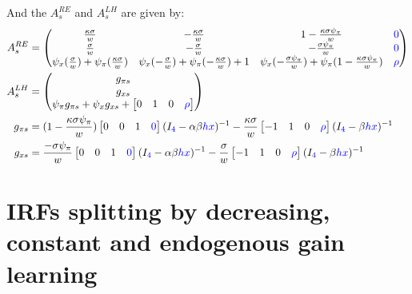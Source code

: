 \documentclass[11pt]{article}
\renewcommand{\[}{\begin{equation}}
\renewcommand{\]}{\end{equation}}
\begin{document}
And the $A^{RE}_s$ and $A^{LH}_s$ are given by:
\begin{align}
A_s^{RE} &= \begin{pmatrix}   \frac{\kappa\sigma}{w}  &-\frac{\kappa\sigma}{w}  & 1-\frac{\kappa\sigma\psi_{\pi}}{w} & \textcolor{blue}{0}\\
 \frac{ \sigma}{w} &  -\frac{\sigma}{w} & -\frac{\sigma\psi_{\pi}}{w} & \textcolor{blue}{0}\\ 
 \psi_x( \frac{\sigma}{w}) + \psi_{\pi}( \frac{\kappa\sigma}{w}) & \psi_x(- \frac{\sigma}{w}) + \psi_{\pi}(- \frac{\kappa\sigma}{w}) +1 &  \psi_x(-\frac{\sigma\psi_{\pi}}{w}) + \psi_{\pi}( 1-\frac{\kappa\sigma\psi_{\pi}}{w}) & \textcolor{blue}{\rho}\end{pmatrix}  
\\
 A_s^{LH} & = \begin{pmatrix} g_{\pi s} \\ g_{x s} \\ \psi_{\pi}g_{\pi s} + \psi_xg_{x s} + \begin{bmatrix} 0 & 1& 0 & \textcolor{blue}{\rho}\end{bmatrix}
\end{pmatrix} \\
g_{\pi s} & = (1-\frac{\kappa\sigma\psi_{\pi}}{w} )\begin{bmatrix} 0&0&1 & \textcolor{blue}{0}\end{bmatrix} (I_{\textcolor{blue}{4}} - \alpha\beta \textcolor{blue}{hx})^{-1} -\frac{\kappa\sigma}{w}\begin{bmatrix} -1&1&0 & \textcolor{blue}{\rho} \end{bmatrix} (I_{\textcolor{blue}{4}} -\beta \textcolor{blue}{hx})^{-1}\\
g_{x s} & =  \frac{-\sigma\psi_{\pi}}{w} \begin{bmatrix} 0&0&1& \textcolor{blue}{0} \end{bmatrix}(I_{\textcolor{blue}{4}} - \alpha\beta \textcolor{blue}{hx})^{-1}  -\frac{\sigma}{w}\begin{bmatrix} -1&1&0 & \textcolor{blue}{\rho}\end{bmatrix}(I_{\textcolor{blue}{4}} -\beta \textcolor{blue}{hx})^{-1}
\end{align}

\newpage
\section{IRFs splitting by decreasing, constant and endogenous gain learning}
\end{document}
